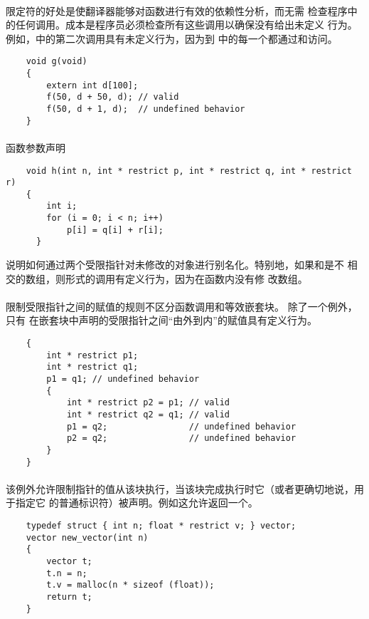 {\paragraph{}
限定符的好处是使翻译器能够对函数进行有效的依赖性分析，而无需
检查程序中的任何调用。成本是程序员必须检查所有这些调用以确保没有给出未定义
行为。例如，中的第二次调用具有未定义行为，因为到
中的每一个都通过和访问。
\begin{lstlisting}
    void g(void)
    {
        extern int d[100];
        f(50, d + 50, d); // valid
        f(50, d + 1, d);  // undefined behavior
    }
\end{lstlisting}

\paragraph{}
\ex 函数参数声明
\begin{lstlisting}
    void h(int n, int * restrict p, int * restrict q, int * restrict r)
    {
        int i;
        for (i = 0; i < n; i++)
            p[i] = q[i] + r[i];
      }
\end{lstlisting}
说明如何通过两个受限指针对未修改的对象进行别名化。特别地，如果和是不
相交的数组，则形式的调用有定义行为，因为在函数内没有修
改数组。

\paragraph{}
\ex 限制受限指针之间的赋值的规则不区分函数调用和等效嵌套块。 除了一个例外，只有
在嵌套块中声明的受限指针之间``由外到内''的赋值具有定义行为。
\begin{lstlisting}
    {
        int * restrict p1;
        int * restrict q1;
        p1 = q1; // undefined behavior
        {
            int * restrict p2 = p1; // valid
            int * restrict q2 = q1; // valid
            p1 = q2;                // undefined behavior
            p2 = q2;                // undefined behavior
        }
    }
\end{lstlisting}

\paragraph{}
该例外允许限制指针的值从该块执行，当该块完成执行时它（或者更确切地说，用于指定它
的普通标识符）被声明。例如这允许返回一个。
\begin{lstlisting}
    typedef struct { int n; float * restrict v; } vector;
    vector new_vector(int n)
    {
        vector t;
        t.n = n;
        t.v = malloc(n * sizeof (float));
        return t;
    }
\end{lstlisting}

}
